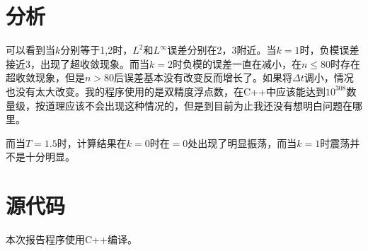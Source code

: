 \documentclass[12pt, a4paper]{ctexart}
\begin{document}
	\newpage
	\section{分析}
	
	可以看到当$k$分别等于1,2时，$L^2$和$L^\infty$误差分别在2，3附近。当$k=1$时，负模误差接近3，出现了超收敛现象。而当$k=2$时负模的误差一直在减小，在$n\leq80$时存在超收敛现象，但是$n>80$后误差基本没有改变反而增长了。如果将$\Delta t$调小，情况也没有太大改变。我的程序使用的是双精度浮点数，在C++中应该能达到$10^{308}$数量级，按道理应该不会出现这种情况的，但是到目前为止我还没有想明白问题在哪里。
	
	而当$T=1.5$时，计算结果在$k=0$时在$=0$处出现了明显振荡，而当$k=1$时震荡并不是十分明显。
	
	\section{源代码}
	
	本次报告程序使用C++编译。
	
	\appendix
	
\end{document}
